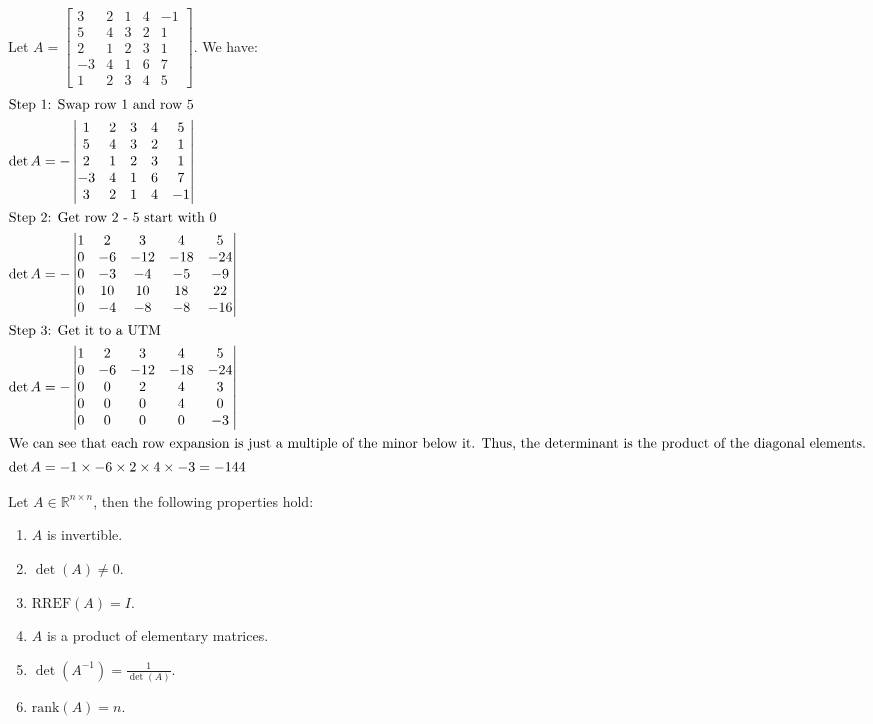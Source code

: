 \documentclass[11pt]{article}
\begin{document}
\begin{example}
    Let $A = \begin{bmatrix} 3 & 2 & 1 & 4 & -1 \\ 5 & 4 & 3 & 2 & 1 \\ 2 & 1 & 2 & 3 & 1 \\ -3 & 4 & 1 & 6 & 7 \\ 1 & 2 & 3 & 4 & 5 \end{bmatrix}$. We have:
    \begin{align*}
        \intertext{Step 1: Swap row 1 and row 5}
        \det A &= -\begin{vmatrix} 1 & 2 & 3 & 4 & 5 \\ 5 & 4 & 3 & 2 & 1 \\ 2 & 1 & 2 & 3 & 1 \\ -3 & 4 & 1 & 6 & 7 \\ 3 & 2 & 1 & 4 & -1 \end{vmatrix} \\
        \intertext{Step 2: Get row 2 - 5 start with 0}
        \det A &= -\begin{vmatrix} 1 & 2 & 3 & 4 & 5 \\ 0 & -6 &-12 & -18 & -24 \\ 0 & -3 & -4 & -5 & -9 \\ 0 & 10 & 10 & 18 & 22 \\ 0 & -4 & -8 & -8 & -16 \end{vmatrix} \\
        \intertext{Step 3: Get it to a UTM}
        \det A &= -\begin{vmatrix} 1 & 2 & 3 & 4 & 5 \\ 0 & -6 &-12 & -18 & -24 \\ 0 & 0 & 2 & 4 & 3 \\ 0 & 0 & 0 & 4 & 0 \\ 0 & 0 & 0 & 0 & -3 \end{vmatrix} \\
        \intertext{We can see that each row expansion is just a multiple of the minor below it. Thus, the determinant is the product of the diagonal elements.}
        \det A &= -1 \times -6 \times 2 \times 4 \times -3 = -144
    \end{align*}
\end{example}
\begin{theorem}
    Let $A \in \mathbb{R}^{n \times n}$, then the following properties hold:
    \begin{enumerate}
        \item $A$ is invertible.
        \item $\det(A) \neq 0$.
        \item $\text{RREF}(A) = I$.
        \item $A$ is a product of elementary matrices.
        \item $\det(A^{-1}) = \frac{1}{\det(A)}$.
        \item $\text{rank}(A) = n$.
    \end{enumerate}
\end{theorem}
\end{document}
